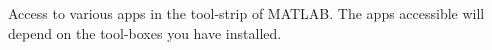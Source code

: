 \label{fig:MatlabApp} Access to various apps in the tool-strip of MATLAB. The apps accessible will depend on the tool-boxes you have installed.